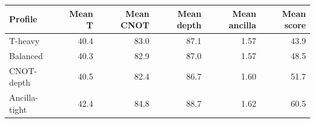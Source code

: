 \begin{tabular}{lrrrrr}
\toprule
Profile & Mean T & Mean CNOT & Mean depth & Mean ancilla & Mean score \\
\midrule
T-heavy & 40.4 & 83.0 & 87.1 & 1.57 & 43.9 \\
Balanced & 40.3 & 82.9 & 87.0 & 1.57 & 48.5 \\
CNOT-depth & 40.5 & 82.4 & 86.7 & 1.60 & 51.7 \\
Ancilla-tight & 42.4 & 84.8 & 88.7 & 1.62 & 60.5 \\
\bottomrule
\end{tabular}
